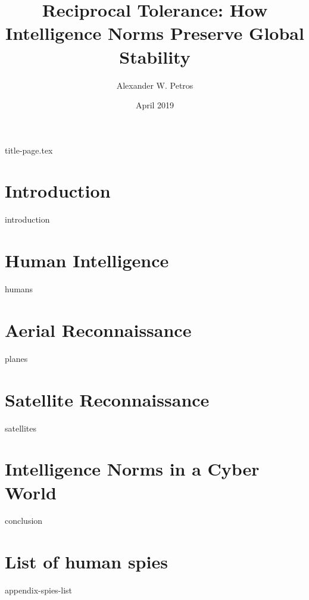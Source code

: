 \documentclass{memoir}
\title{Reciprocal Tolerance: How Intelligence Norms Preserve Global Stability}
\author{Alexander W. Petros}
\date{April 2019}
\begin{document}
    \frontmatter
    {title-page.tex}

    \tableofcontents
    \newpage
    \thispagestyle{empty}

    \listoffigures
    \listoftables
    \newpage


    \mainmatter
    \chapter{Introduction}
    {introduction}

    \chapter{Human Intelligence}
    {humans}

    \chapter{Aerial Reconnaissance}
    {planes}

    \chapter{Satellite Reconnaissance}
    {satellites}

    \chapter{Intelligence Norms in a Cyber World}
    {conclusion}


    \appendix
    \chapter{List of human spies}
    {appendix-spies-list}
\end{document}
